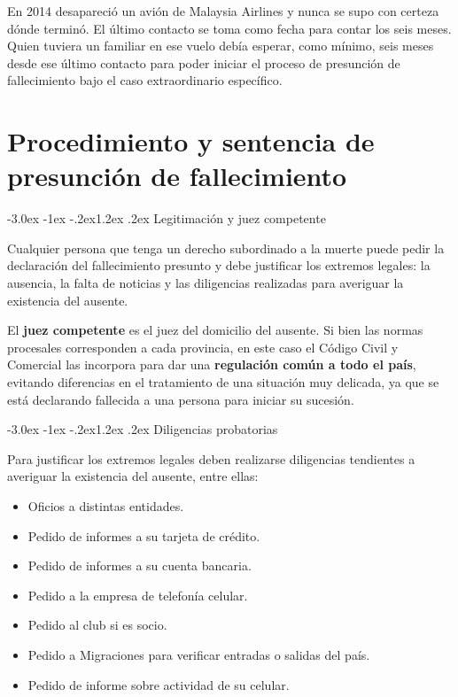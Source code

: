 \documentclass[12pt,oneside]{book}
\makeatletter
\renewcommand\section{\@startsection{section}{1}{\z@}%
  {-3.0ex \@plus -1ex \@minus -.2ex}{1.2ex \@plus .2ex}%
  {\normalfont\large\bfseries\color{acento}}}
\makeatother
\begin{document}
\begin{ejemplo}
En 2014 desapareció un avión de Malaysia Airlines y nunca se supo con
certeza dónde terminó. El último contacto se toma como fecha para contar
los seis meses. Quien tuviera un familiar en ese vuelo debía esperar, como
mínimo, seis meses desde ese último contacto para poder iniciar el
proceso de presunción de fallecimiento bajo el caso extraordinario
específico.
\end{ejemplo}


\chapter{Procedimiento y sentencia de presunción de fallecimiento}
\section{Legitimación y juez competente}

\begin{regla}
Cualquier persona que tenga un derecho subordinado a la muerte puede
pedir la declaración del fallecimiento presunto y debe justificar los
extremos legales: la ausencia, la falta de noticias y las diligencias
realizadas para averiguar la existencia del ausente.
\end{regla}

El \textbf{juez competente} es el juez del domicilio del ausente. Si bien
las normas procesales corresponden a cada provincia, en este caso el
Código Civil y Comercial las incorpora para dar una
\textbf{regulación común a todo el país}, evitando diferencias en el
tratamiento de una situación muy delicada, ya que se está declarando
fallecida a una persona para iniciar su sucesión.

\section{Diligencias probatorias}

Para justificar los extremos legales deben realizarse diligencias
tendientes a averiguar la existencia del ausente, entre ellas:

\begin{itemize}
    \item Oficios a distintas entidades.
    \item Pedido de informes a su tarjeta de crédito.
    \item Pedido de informes a su cuenta bancaria.
    \item Pedido a la empresa de telefonía celular.
    \item Pedido al club si es socio.
    \item Pedido a Migraciones para verificar entradas o salidas del país.
    \item Pedido de informe sobre actividad de su celular.
\end{itemize}
\end{document}
